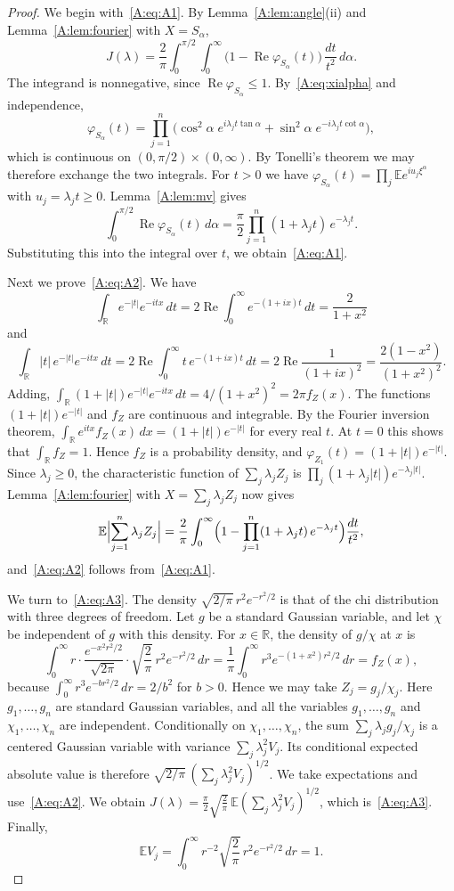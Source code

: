 \documentclass[11pt]{amsart}
\theoremstyle{remark}
\numberwithin{equation}{section}
\newcommand{\R}{\mathbb{R}}
\newcommand{\E}{\mathbb{E}}
\begin{document}
\begin{proof}
We begin with~\eqref{A:eq:A1}. By Lemma~\ref{A:lem:angle}(ii) and Lemma~\ref{A:lem:fourier} with $X=S_\alpha$,
\[
J(\lambda)=\frac2\pi\int_0^{\pi/2}\int_0^\infty\bigl(1-\operatorname{Re}\varphi_{S_\alpha}(t)\bigr)\,\frac{dt}{t^2}\,d\alpha.
\]
The integrand is nonnegative, since $\operatorname{Re}\varphi_{S_\alpha}\le1$. By~\eqref{A:eq:xialpha} and independence,
\[
\varphi_{S_\alpha}(t)=\prod_{j=1}^n\bigl(\cos^2\alpha\;e^{i\lambda_jt\tan\alpha}+\sin^2\alpha\;e^{-i\lambda_jt\cot\alpha}\bigr),
\]
which is continuous on $(0,\pi/2)\times(0,\infty)$. By Tonelli's theorem we may therefore exchange the two integrals. For $t>0$ we have $\varphi_{S_\alpha}(t)=\prod_j\E e^{iu_j\xi^\alpha}$ with $u_j=\lambda_jt\ge0$. Lemma~\ref{A:lem:mv} gives
\[
\int_0^{\pi/2}\operatorname{Re}\varphi_{S_\alpha}(t)\,d\alpha=\frac\pi2\prod_{j=1}^n(1+\lambda_jt)\,e^{-\lambda_jt}.
\]
Substituting this into the integral over $t$, we obtain~\eqref{A:eq:A1}.

Next we prove~\eqref{A:eq:A2}. We have
\[
\int_\R e^{-|t|}e^{-itx}\,dt=2\operatorname{Re}\int_0^\infty e^{-(1+ix)t}\,dt=\frac2{1+x^2}
\]
and
\[
\int_\R|t|\,e^{-|t|}e^{-itx}\,dt=2\operatorname{Re}\int_0^\infty t\,e^{-(1+ix)t}\,dt=2\operatorname{Re}\frac1{(1+ix)^2}=\frac{2(1-x^2)}{(1+x^2)^2}.
\]
Adding, $\int_\R(1+|t|)e^{-|t|}e^{-itx}\,dt=4/(1+x^2)^2=2\pi f_Z(x)$. The functions $(1+|t|)e^{-|t|}$ and $f_Z$ are continuous and integrable. By the Fourier inversion theorem, $\int_\R e^{itx}f_Z(x)\,dx=(1+|t|)e^{-|t|}$ for every real $t$. At $t=0$ this shows that $\int_\R f_Z=1$. Hence $f_Z$ is a probability density, and $\varphi_{Z_1}(t)=(1+|t|)e^{-|t|}$. Since $\lambda_j\ge0$, the characteristic function of $\sum_j\lambda_jZ_j$ is $\prod_j(1+\lambda_j|t|)e^{-\lambda_j|t|}$. Lemma~\ref{A:lem:fourier} with $X=\sum_j\lambda_jZ_j$ now gives
\[
\E\Bigl|\sum_{j=1}^n\lambda_jZ_j\Bigr|=\frac2\pi\int_0^\infty\Bigl(1-\prod_{j=1}^n(1+\lambda_jt)\,e^{-\lambda_jt}\Bigr)\frac{dt}{t^2},
\]
and~\eqref{A:eq:A2} follows from~\eqref{A:eq:A1}.

We turn to~\eqref{A:eq:A3}. The density $\sqrt{2/\pi}\,r^2e^{-r^2/2}$ is that of the chi distribution with three degrees of freedom. Let $g$ be a standard Gaussian variable, and let $\chi$ be independent of $g$ with this density. For $x\in\R$, the density of $g/\chi$ at $x$ is
\[
\int_0^\infty r\cdot\frac{e^{-x^2r^2/2}}{\sqrt{2\pi}}\cdot\sqrt{\frac2\pi}\,r^2e^{-r^2/2}\,dr=\frac1\pi\int_0^\infty r^3e^{-(1+x^2)r^2/2}\,dr=f_Z(x),
\]
because $\int_0^\infty r^3e^{-br^2/2}\,dr=2/b^2$ for $b>0$. Hence we may take $Z_j=g_j/\chi_j$. Here $g_1,\dots,g_n$ are standard Gaussian variables, and all the variables $g_1,\dots,g_n$ and $\chi_1,\dots,\chi_n$ are independent. Conditionally on $\chi_1,\dots,\chi_n$, the sum $\sum_j\lambda_jg_j/\chi_j$ is a centered Gaussian variable with variance $\sum_j\lambda_j^2V_j$. Its conditional expected absolute value is therefore $\sqrt{2/\pi}\,(\sum_j\lambda_j^2V_j)^{1/2}$. We take expectations and use~\eqref{A:eq:A2}. We obtain $J(\lambda)=\frac\pi2\sqrt{\frac2\pi}\,\E(\sum_j\lambda_j^2V_j)^{1/2}$, which is~\eqref{A:eq:A3}. Finally,
\[
\E V_j=\int_0^\infty r^{-2}\sqrt{\frac2\pi}\,r^2e^{-r^2/2}\,dr=1.
\]


\end{proof}
\end{document}
